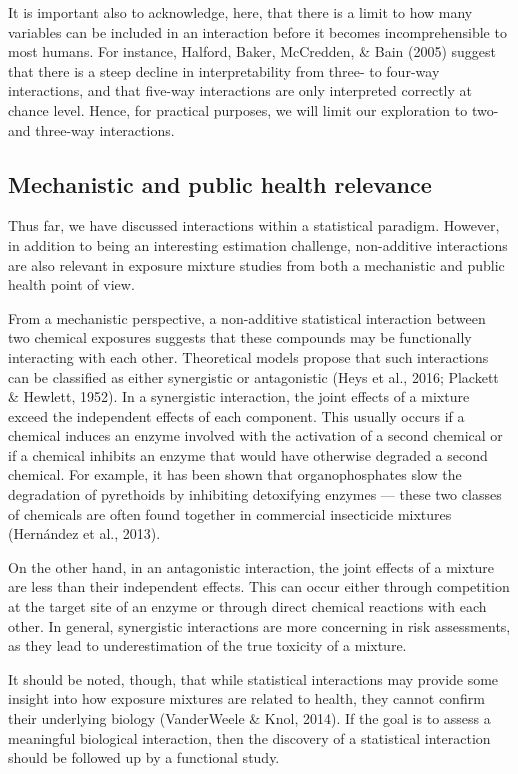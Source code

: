 \documentclass[12pt, twoside]{amherstthesis}
\begin{document}
It is important also to acknowledge, here, that there is a limit to how many variables can be included in an interaction before it becomes incomprehensible to most humans. For instance, Halford, Baker, McCredden, \& Bain (2005) suggest that there is a steep decline in interpretability from three- to four-way interactions, and that five-way interactions are only interpreted correctly at chance level. Hence, for practical purposes, we will limit our exploration to two- and three-way interactions.

\hypertarget{mechanistic-and-public-health-relevance}{%
\subsection{Mechanistic and public health relevance}\label{mechanistic-and-public-health-relevance}}

Thus far, we have discussed interactions within a statistical paradigm. However, in addition to being an interesting estimation challenge, non-additive interactions are also relevant in exposure mixture studies from both a mechanistic and public health point of view.

From a mechanistic perspective, a non-additive statistical interaction between two chemical exposures suggests that these compounds may be functionally interacting with each other. Theoretical models propose that such interactions can be classified as either synergistic or antagonistic (Heys et al., 2016; Plackett \& Hewlett, 1952). In a synergistic interaction, the joint effects of a mixture exceed the independent effects of each component. This usually occurs if a chemical induces an enzyme involved with the activation of a second chemical or if a chemical inhibits an enzyme that would have otherwise degraded a second chemical. For example, it has been shown that organophosphates slow the degradation of pyrethoids by inhibiting detoxifying enzymes --- these two classes of chemicals are often found together in commercial insecticide mixtures (Hernández et al., 2013).

On the other hand, in an antagonistic interaction, the joint effects of a mixture are less than their independent effects. This can occur either through competition at the target site of an enzyme or through direct chemical reactions with each other. In general, synergistic interactions are more concerning in risk assessments, as they lead to underestimation of the true toxicity of a mixture.

It should be noted, though, that while statistical interactions may provide some insight into how exposure mixtures are related to health, they cannot confirm their underlying biology (VanderWeele \& Knol, 2014). If the goal is to assess a meaningful biological interaction, then the discovery of a statistical interaction should be followed up by a functional study.
\end{document}
